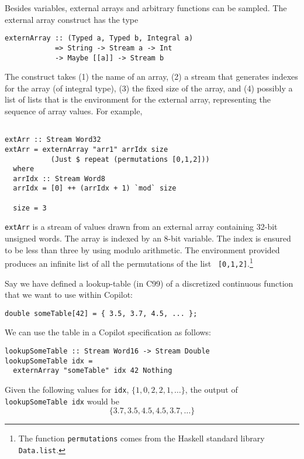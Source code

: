 Besides variables, external arrays and arbitrary functions can be sampled.  The
external array construct has the type
%
\begin{lstlisting}[frame=single]
externArray :: (Typed a, Typed b, Integral a) 
            => String -> Stream a -> Int 
            -> Maybe [[a]] -> Stream b  
\end{lstlisting}
%
The construct takes (1) the name of an array, (2) a stream that generates indexes for
the array (of integral type), (3) the fixed size of the array, and (4) possibly a list of lists that is the
environment for the external array, representing the sequence of array values.  For example,
%
\begin{lstlisting}[frame=single]

extArr :: Stream Word32
extArr = externArray "arr1" arrIdx size 
           (Just $ repeat (permutations [0,1,2]))
  where 
  arrIdx :: Stream Word8
  arrIdx = [0] ++ (arrIdx + 1) `mod` size

  size = 3
\end{lstlisting} 
{\tt extArr} is a stream of values drawn from an external array containing
32-bit unsigned words.  The array is indexed by an 8-bit variable.  The index
is ensured to be less than three by using modulo arithmetic.  The environment
provided produces an infinite list of all the permutations of the list {\tt
  [0,1,2]}.\footnote{The function {\tt permutations} comes from the Haskell
    standard library {\tt Data.list}.}



%
\begin{example}
\label{exm:e}
Say we have defined a lookup-table (in C99) of a discretized continuous function that we want to use
within Copilot:
%
\begin{lstlisting}
double someTable[42] = { 3.5, 3.7, 4.5, ... };
\end{lstlisting}
%
We can use the table in a Copilot specification as follows:
%
\begin{lstlisting}
lookupSomeTable :: Stream Word16 -> Stream Double
lookupSomeTable idx = 
  externArray "someTable" idx 42 Nothing
\end{lstlisting}
%
Given the following values for \texttt{idx}, $\{1, 0, 2, 2, 1, \dots \}$, the output of 
\texttt{lookupSomeTable idx} would be $$\{3.7, 3.5, 4.5, 4.5, 3.7, \dots \}$$
\end{example}

